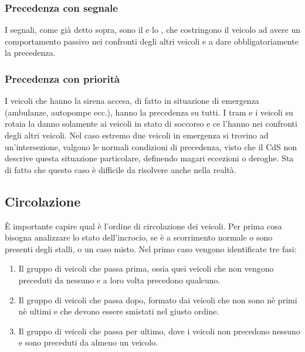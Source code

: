 \subsubsection{Precedenza con segnale}
I segnali, come già detto sopra, sono il  e lo , che costringono il veicolo ad avere un comportamento passivo nei confronti degli altri veicoli e a dare obbligatoriamente la precedenza.

\subsubsection{Precedenza con priorità}
I veicoli che hanno la sirena accesa, di fatto in situazione di emergenza (ambulanze, autopompe ecc.), hanno la precedenza su tutti. I tram e i veicoli su rotaia la danno solamente ai veicoli in stato di soccorso e ce l'hanno nei confronti degli altri veicoli. Nel caso estremo due veicoli in emergenza si trovino ad un'intersezione, valgono le normali condizioni di precedenza, visto che il CdS non descrive questa situazione particolare, definendo magari eccezioni o deroghe. Sta di fatto che questo caso è difficile da risolvere anche nella realtà.

\subsection{Circolazione}
È importante capire qual è l'ordine di circolazione dei veicoli. Per prima cosa bisogna analizzare lo stato dell'incrocio, se è a scorrimento normale o sono presenti degli stalli, o un caso misto. Nel primo caso vengono identificate tre fasi:
\begin{enumerate}
	\item Il gruppo di veicoli che passa prima, ossia quei veicoli che non vengono preceduti da nessuno e a loro volta precedono qualcuno.
	\item Il gruppo di veicoli che passa dopo, formato dai veicoli che non sono nè primi nè ultimi e che devono essere smistati nel giusto ordine.
	\item Il gruppo di veicoli che passa per ultimo, dove i veicoli non precedono nessuno e sono preceduti da almeno un veicolo.
\end{enumerate}

